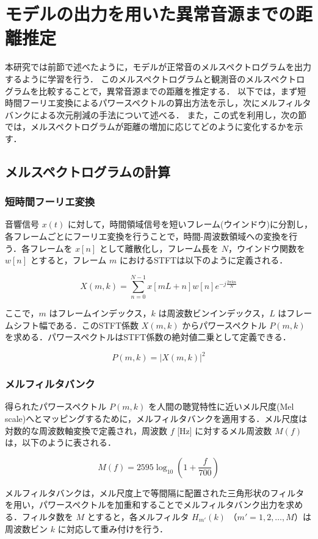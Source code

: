 \documentclass[../main]{subfiles}
\begin{document}
\section{モデルの出力を用いた異常音源までの距離推定}
本研究では前節で述べたように，モデルが正常音のメルスペクトログラムを出力するように学習を行う．
このメルスペクトログラムと観測音のメルスペクトログラムを比較することで，異常音源までの距離を推定する．
以下では，まず短時間フーリエ変換によるパワースペクトルの算出方法を示し，次にメルフィルタバンクによる次元削減の手法について述べる．
また，この式を利用し，次の節では，メルスペクトログラムが距離の増加に応じてどのように変化するかを示す．

\subsection{メルスペクトログラムの計算}

\subsubsection{短時間フーリエ変換}

音響信号 $x(t)$ に対して，時間領域信号を短いフレーム(ウインドウ)に分割し，各フレームごとにフーリエ変換を行うことで，時間-周波数領域への変換を行う．各フレームを $x[n]$ として離散化し，フレーム長を $N$，ウインドウ関数を $w[n]$ とすると，フレーム $m$ におけるSTFTは以下のように定義される．

\[
X(m, k) = \sum_{n=0}^{N-1} x[mL + n] w[n] e^{-j \frac{2\pi k n}{N}}
\]

ここで，$m$ はフレームインデックス，$k$ は周波数ビンインデックス，$L$ はフレームシフト幅である．このSTFT係数 $X(m, k)$ からパワースペクトル $P(m, k)$ を求める．パワースペクトルはSTFT係数の絶対値二乗として定義できる．

\[
P(m, k) = |X(m, k)|^2
\]

\subsubsection{メルフィルタバンク}


得られたパワースペクトル $P(m, k)$ を人間の聴覚特性に近いメル尺度(Mel scale)へとマッピングするために，メルフィルタバンクを適用する．メル尺度は対数的な周波数軸変換で定義され，周波数 $f$ [Hz] に対するメル周波数 $M(f)$ は，以下のように表される．

\[
M(f) = 2595 \log_{10}\left(1 + \frac{f}{700}\right)
\]

メルフィルタバンクは，メル尺度上で等間隔に配置された三角形状のフィルタを用い，パワースペクトルを加重和することでメルフィルタバンク出力を求める．フィルタ数を $M$ とすると，各メルフィルタ $H_{m'}(k)$ （$m' = 1, 2, \dots, M$）は周波数ビン $k$ に対応して重み付けを行う．
\end{document}
